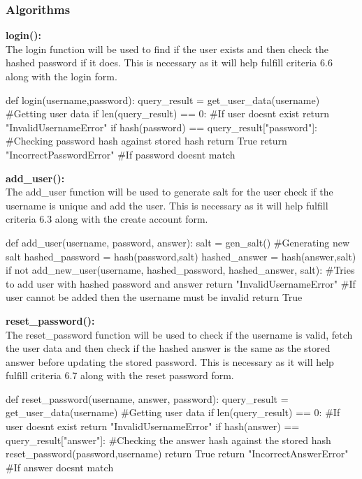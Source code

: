 \documentclass{article}
\begin{document}
        \subsubsection{Algorithms}
        \textbf{login():}\\
        The login function will be used to find if the user exists and then check the hashed password if it does. This is necessary as it will help fulfill criteria 6.6 along with the login form.\\
        \begin{python}
def login(username,password):
   query_result = get_user_data(username) #Getting user data
   if len(query_result) == 0: #If user doesnt exist
      return "InvalidUsernameError" 
   if hash(password) == query_result["password"]: #Checking password hash against stored hash
      return True
   return "IncorrectPasswordError" #If password doesnt match
        \end{python}
        \textbf{add\_user():}\\
        The add\_user function will be used to generate salt for the user check if the username is unique and add the user. This is necessary as it will help fulfill criteria 6.3 along with the create account form.\\
        \begin{python}
def add_user(username, password, answer):
   salt = gen_salt() #Generating new salt
   hashed_password = hash(password,salt)
   hashed_answer = hash(answer,salt)
   if not add_new_user(username, hashed_password, hashed_answer, salt): #Tries to add user with hashed password and answer
      return "InvalidUsernameError" #If user cannot be added then the username must be invalid
   return True
        \end{python}
        \textbf{reset\_password():}\\
        The reset\_password function will be used to check if the username is valid, fetch the user data and then check if the hashed answer is the same as the stored answer before updating the stored password. This is necessary as it will help fulfill criteria 6.7 along with the reset password form.\\
        \begin{python}
def reset_password(username, answer, password):
   query_result = get_user_data(username) #Getting user data
   if len(query_result) == 0: #If user doesnt exist
      return "InvalidUsernameError"
   if hash(answer) == query_result["answer"]: #Checking the answer hash against the stored hash
      reset_password(password,username)
      return True
   return "IncorrectAnswerError" #If answer doesnt match
        \end{python}
\end{document}
